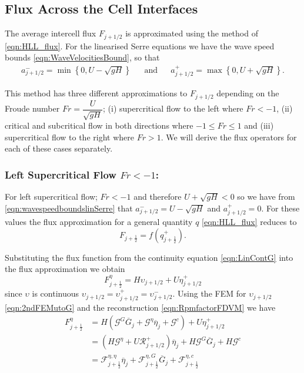 \subsection{Flux Across the Cell Interfaces}
The average intercell flux $F_{j+1/2}$ is approximated using the method of \citet{Kurganov-etal-2001-707} \eqref{eqn:HLL_flux}. For the linearised Serre equations we have the wave speed bounds \eqref{eqn:WaveVelocitiesBound}, so that
\begin{align}
a^-_{j+ 1/2} = \min \left\lbrace 0,  U - \sqrt{g H} \right \rbrace& &\text{and}& &a^+_{j+ 1/2} =  \max \left\lbrace 0, U + \sqrt{g H} \right \rbrace .
\label{eqn:wavespeedboundslinSerre}
\end{align}

This method has three different approximations to $F_{j+1/2}$ depending on the Froude number $Fr = \dfrac{U}{\sqrt{gH}}$; (i)
supercritical flow to the left where $Fr < -1$, (ii) critical and subcritical flow in both directions where $-1 \le Fr \le 1$ and (iii) supercritical flow to the right where $Fr > 1$. We will derive the flux operators for each of these cases separately.

\subsubsection{Left Supercritical Flow $Fr < -1$:}
For left supercritical flow; $Fr < -1$ and therefore $U + \sqrt{g H} < 0$ so we have from \eqref{eqn:wavespeedboundslinSerre} that $a^-_{j+ 1/2} = U - \sqrt{g H}$ and $a^+_{j+ 1/2} =  0$. For these values the flux approximation for a general quantity $q$ \eqref{eqn:HLL_flux} reduces to 
\begin{equation}
F_{j+\frac{1}{2}} = f\left(q^+_{j+\frac{1}{2}}\right).
\label{eqn:fluxleftsupercrit}
\end{equation}

Substituting the flux function from the continuity equation \eqref{eqn:LinContG} into the flux approximation we obtain
\begin{equation*}
F^\eta_{j+\frac{1}{2}} = H \upsilon_{j+1/2} + U \eta^+_{j+1/2}
\end{equation*}
since $\upsilon$ is continuous $\upsilon_{j+1/2} = \upsilon_{j+1/2}^+ = \upsilon_{j+1/2}^- $. Using the FEM for $\upsilon_{j+1/2}$ \eqref{eqn:2ndFEMutoG} and the reconstruction \eqref{eqn:RpmfactorFDVM} we have
\begin{align}
F^\eta_{j+\frac{1}{2}} &= H \left(\mathcal{G}^G \overline{G}_{j} + \mathcal{G}^{\eta} \overline{\eta}_{j} + \mathcal{G}^c\right) + U \eta^+_{j+1/2} \nonumber \\ &= \left(H \mathcal{G}^{\eta} + U \mathcal{R}^+_{j+1/2} \right)  \overline{\eta}_{j} + H \mathcal{G}^G \overline{G}_{j} + H\mathcal{G}^c \nonumber \\
&= \mathcal{F}^{\eta, \eta}_{j+\frac{1}{2}} \overline{\eta}_{j} + \mathcal{F}^{\eta, G}_{j+\frac{1}{2}} \overline{G}_{j} + \mathcal{F}^{\eta, c}_{j+\frac{1}{2}}
\label{eqn:Fluxfactorsupercritetaleft}
\end{align}

